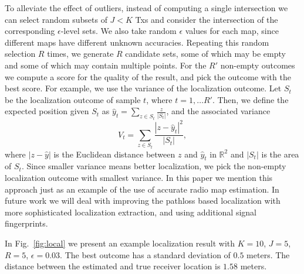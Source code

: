 \documentclass[10pt,a4paper]{article}
\begin{document}
To alleviate the effect of outliers,  instead of computing a single intersection 
we can select random subsets of $J < K$ Txs and consider the intersection of the corresponding 
$\epsilon$-level sets. We also take random $\epsilon$ values for each map, since different maps have different unknown accuracies.  Repeating this random selection $R$ times, we generate $R$ candidate sets, some of which may be empty and some of which may contain multiple points. For the $R'$ non-empty outcomes 
we compute a score for the quality of the result, and pick the outcome with the best score.
%
For example, we use the variance of the localization outcome.
Let $S_t$ be the localization outcome of sample $t$, where $t=1,\ldots R'$. Then, 
we define the expected position given $S_t$ as
$\widehat{y}_t  = \sum_{z \in S_t} \frac{z}{|S_t|}$,
and the associated variance 
\[V_t = \sum_{z \in S_t}   \frac{|z-\widehat{y}_t|^2}{|S_t|},\]
where $|z - \widehat{y}|$ is the Euclidean distance between $z$ and $\widehat{y}_t$ in $\mathbb{R}^2$ and $|S_t|$ is the area of $S_t$. 
Since smaller variance means better localization, we pick the non-empty localization outcome 
with smallest variance.
%
In this paper we mention this approach just as an example of the use of accurate radio map estimation. 
In future work we will deal with improving the pathloss based localization with more sophisticated 
localization extraction, and using additional signal fingerprints.

In Fig.~\ref{fig:local}  we present an example localization result with $K=10$, $J=5$, $R=5$, $\epsilon = 0.03$. The best outcome has a standard deviation of $0.5$ meters. %
The distance between the estimated and true receiver location is $1.58$ meters.





%
\end{document}
